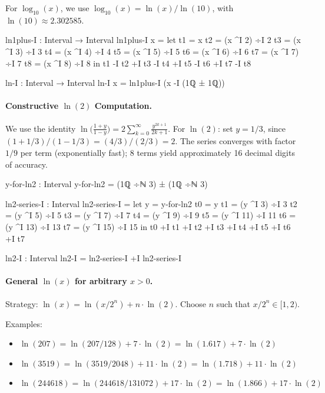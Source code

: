 \documentclass[11pt,a4paper]{book}
\begin{document}
For $\log_{10}(x)$, we use $\log_{10}(x) = \ln(x) / \ln(10)$, with $\ln(10) \approx 2.302585$.

\begin{code}
ln1plus-I : Interval → Interval
ln1plus-I x = 
  let t1 = x
      t2 = (x ^I 2) ÷I 2
      t3 = (x ^I 3) ÷I 3
      t4 = (x ^I 4) ÷I 4
      t5 = (x ^I 5) ÷I 5
      t6 = (x ^I 6) ÷I 6
      t7 = (x ^I 7) ÷I 7
      t8 = (x ^I 8) ÷I 8
  in t1 -I t2 +I t3 -I t4 +I t5 -I t6 +I t7 -I t8

ln-I : Interval → Interval
ln-I x = ln1plus-I (x -I (1ℚ ± 1ℚ))

\end{code}

\paragraph{Constructive $\ln(2)$ Computation.}
We use the identity $\ln\bigl(\frac{1+y}{1-y}\bigr) = 2 \sum_{k=0}^{\infty} \frac{y^{2k+1}}{2k+1}$.
For $\ln(2)$: set $y = 1/3$, since $(1 + 1/3)/(1 - 1/3) = (4/3)/(2/3) = 2$.
The series converges with factor $1/9$ per term (exponentially fast);
8 terms yield approximately 16 decimal digits of accuracy.

\begin{code}
y-for-ln2 : Interval
y-for-ln2 = (1ℚ ÷ℕ 3) ± (1ℚ ÷ℕ 3)

ln2-series-I : Interval
ln2-series-I = 
  let y = y-for-ln2
      t0 = y
      t1 = (y ^I 3) ÷I 3
      t2 = (y ^I 5) ÷I 5
      t3 = (y ^I 7) ÷I 7
      t4 = (y ^I 9) ÷I 9
      t5 = (y ^I 11) ÷I 11
      t6 = (y ^I 13) ÷I 13
      t7 = (y ^I 15) ÷I 15
  in t0 +I t1 +I t2 +I t3 +I t4 +I t5 +I t6 +I t7

ln2-I : Interval
ln2-I = ln2-series-I +I ln2-series-I

\end{code}

\paragraph{General $\ln(x)$ for arbitrary $x > 0$.}
Strategy: $\ln(x) = \ln(x/2^n) + n \cdot \ln(2)$.
Choose $n$ such that $x/2^n \in [1, 2)$.

Examples:
\begin{itemize}
\item $\ln(207) = \ln(207/128) + 7 \cdot \ln(2) = \ln(1.617) + 7 \cdot \ln(2)$
\item $\ln(3519) = \ln(3519/2048) + 11 \cdot \ln(2) = \ln(1.718) + 11 \cdot \ln(2)$
\item $\ln(244618) = \ln(244618/131072) + 17 \cdot \ln(2) = \ln(1.866) + 17 \cdot \ln(2)$
\end{itemize}
\end{document}
